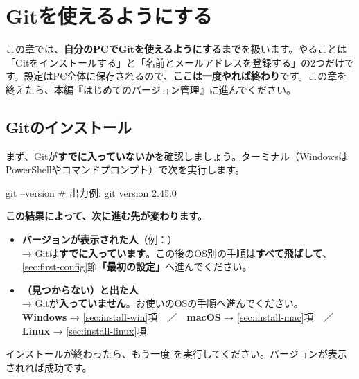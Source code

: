 \chapter{Gitを使えるようにする}

この章では、\textbf{自分のPCでGitを使えるようにするまで}を扱います。やることは「Gitをインストールする」と「名前とメールアドレスを登録する」の2つだけです。設定はPC全体に保存されるので、\textbf{ここは一度やれば終わり}です。この章を終えたら、本編『はじめてのバージョン管理』に進んでください。


\section{Gitのインストール}

まず、Gitが\textbf{すでに入っていないか}を確認しましょう。ターミナル（WindowsはPowerShellやコマンドプロンプト）で次を実行します。

\begin{codebox}[bash]
\begin{code}
git --version
# 出力例: git version 2.45.0
\end{code}
\end{codebox}

\textbf{この結果によって、次に進む先が変わります。}

\begin{itemize}[leftmargin=1.4em]
  \item \textbf{バージョンが表示された人}（例：）\\
        → Gitは\textbf{すでに入っています}。この後のOS別の手順は\textbf{すべて飛ばして}、\ref{sec:first-config}節\textbf{「最初の設定」}へ進んでください。
  \item \textbf{（見つからない）と出た人}\\
        → Gitが\textbf{入っていません}。お使いのOSの手順へ進んでください。\\
        \textbf{Windows} → \ref{sec:install-win}項　／　\textbf{macOS} → \ref{sec:install-mac}項　／　\textbf{Linux} → \ref{sec:install-linux}項
\end{itemize}

インストールが終わったら、もう一度  を実行してください。バージョンが表示されれば成功です。

